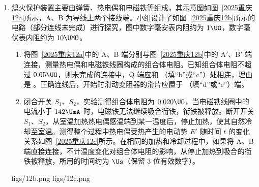 \documentclass[\gkver]{gaokaozhenti}
\begin{document}
\begin{enumerate}
\item
熄火保护装置主要由弹簧、热电偶和电磁铁等组成，其示意图如图~\ref{2025重庆12a}所示，A、B 为导线上两个接线端。小组设计了如图~\ref{2025重庆12b}所示的电路（部分连线未完成）进行探究，图中数字毫安表内阻约为 $1 \UO$，数字毫伏表内阻约为 $10 \UMO$。
\begin{enumerate}
	\item
	将图~\ref{2025重庆12a}中的 A、B 端分别与图~\ref{2025重庆12b}中的 A$'$、B$'$ 端连接，测量热电偶和电磁铁线圈构成的组合体电阻。已知组合体电阻不超过 $0.05 \UO$，则未完成的连接中，Q 端应和 （填“b”或“c”）处相连，理由是 。正确连线后，开始时滑动变阻器的滑片应置于 （填“d”或“e”）端。
	\item
	闭合开关 $S_{1}$、$S_{2}$，实验测得组合体电阻为 $0.020 \UO$，当电磁铁线圈中的电流小于 $142 \UmA$ 时，电磁铁无法继续吸合衔铁，衔铁被释放。断开开关 $S_{1}$、$S_{2}$，从室温加热热电偶感温端到某一温度后，停止加热，使其自然冷却至室温。测得整个过程中热电偶受热产生的电动势 $E'$ 随时间 $t$ 的变化关系如图~\ref{2025重庆12c}所示。在相同的加热和冷却过程中，如果将 A、B 端直接连接，不计温度变化对组合体电阻的影响，从停止加热到吸合的衔铁被释放，所用的时间约为  $\Us$（保留 3 位有效数字）。
\end{enumerate}

{figs/12b.png}
{figs/12c.png}

\end{enumerate}
\end{document}
